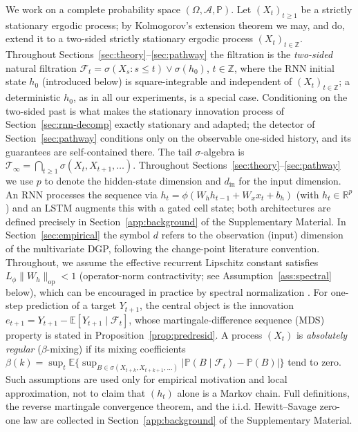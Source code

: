 \documentclass[bj,authoryear]{imsart}
\theoremstyle{plain}
\theoremstyle{definition}
\newcommand{\E}{\mathbb{E}}
\newcommand{\Prob}{\mathbb{P}}
\newcommand{\R}{\mathbb{R}}
\newcommand{\F}{\mathcal{F}}
\newcommand{\Tsig}{\mathcal{T}_\infty}
\begin{document}
We work on a complete probability space $(\Omega, \mathcal{A}, \mathbb{P})$.
Let $(X_t)_{t\geq 1}$ be a strictly stationary ergodic process; by
Kolmogorov's extension theorem we may, and do, extend it to a two-sided
strictly stationary ergodic process $(X_t)_{t\in\mathbb{Z}}$.
Throughout Sections~\ref{sec:theory}--\ref{sec:pathway} the filtration is
the \emph{two-sided} natural filtration
$\mathcal{F}_t=\sigma(X_s:s\leq t)\vee\sigma(h_0)$, $t\in\mathbb{Z}$,
where the RNN initial state $h_0$ (introduced below) is square-integrable
and independent of $(X_t)_{t\in\mathbb{Z}}$; a deterministic $h_0$, as in
all our experiments, is a special case.  Conditioning on the two-sided
past is what makes the stationary innovation process of
Section~\ref{sec:rnn-decomp} exactly stationary and adapted; the detector
of Section~\ref{sec:pathway} conditions only on the observable one-sided
history, and its guarantees are self-contained there.
The tail $\sigma$-algebra is
$\Tsig = \bigcap_{t\geq 1}\sigma(X_t, X_{t+1},\ldots)$.
Throughout Sections~\ref{sec:theory}--\ref{sec:pathway} we use $p$ to denote the hidden-state dimension and $d_{\mathrm{in}}$ for the input dimension.
An RNN processes the sequence via $h_t = \phi(W_h h_{t-1} + W_x x_t + b_h)$ (with $h_t\in\R^p$)
and an LSTM augments this with a gated cell state; both architectures are
defined precisely in Section~\ref{app:background} of the Supplementary Material.
In Section~\ref{sec:empirical} the symbol $d$ refers to the
observation (input) dimension of the multivariate DGP, following the
change-point literature convention.
Throughout, we assume the effective recurrent Lipschitz constant satisfies
$L_\phi\|W_h\|_{\mathrm{op}} < 1$ (operator-norm contractivity;
see Assumption~\ref{ass:spectral} below),
which can be encouraged in practice by spectral normalization
\citep{miyato2018spectral}.
For one-step prediction of a target $Y_{t+1}$, the central object is the
innovation $e_{t+1}=Y_{t+1}-\E[Y_{t+1}\mid\mathcal F_t]$, whose
martingale-difference sequence (MDS) property is stated in
Proposition~\ref{prop:predresid}.
A process $(X_t)$ is \emph{absolutely regular} ($\beta$-mixing) if its
mixing coefficients
$\beta(k)=\sup_t\E\{\sup_{B\in\sigma(X_{t+k},X_{t+k+1},\ldots)}
|\Prob(B\mid\F_t)-\Prob(B)|\}$ tend to zero.  Such assumptions are used only
for empirical motivation and local approximation, not to claim that $(h_t)$
alone is a Markov chain.
Full definitions, the reverse martingale convergence theorem, and the
i.i.d. Hewitt--Savage zero-one law are collected in Section~\ref{app:background} of the Supplementary Material.
\end{document}
